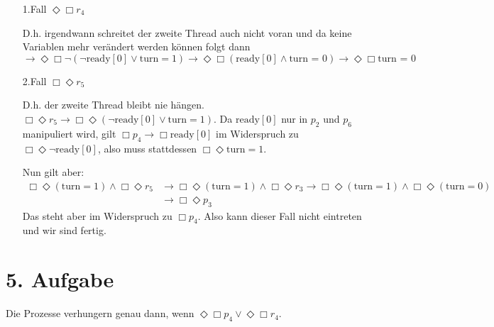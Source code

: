 \documentclass[numbers=noendperiod]{scrartcl}
\begin{document}
\begin{enumerate}[1.]
	\begin{enumerate}[1.]
		\item[1.Fall] $\Diamond \Box r_4$
		
		D.h. irgendwann schreitet der zweite Thread auch nicht voran und da keine Variablen mehr verändert werden können folgt dann $\rightarrow \Diamond \Box \lnot (\lnot \text{ready} [0] \lor \text{turn} = 1) \rightarrow \Diamond \Box (\text{ready}[0] \land \text{turn = 0}) \rightarrow \Diamond \Box \text{turn = 0}$
		
		\item[2.Fall] $\Box \Diamond r_5$
		
		D.h. der zweite Thread bleibt nie hängen. $\Box \Diamond r_5 \rightarrow \Box \Diamond (\lnot \text{ready}[0] \lor \text{turn} = 1)$. Da $\text{ready}[0]$ nur in $p_2$ und $p_6$ manipuliert wird, gilt $\Box p_4 \rightarrow \Box \text{ready}[0]$ im Widerspruch zu $\Box \Diamond \lnot \text{ready}[0]$, also muss stattdessen $\Box \Diamond \text{turn} = 1$.
		
		Nun gilt aber:
		\begin{align}
			 \Box \Diamond (\text{turn} = 1) \land \Box \Diamond r_5 &\rightarrow \Box \Diamond (\text{turn} = 1) \land \Box \Diamond r_3 \rightarrow \Box \Diamond (\text{turn} = 1) \land \Box \Diamond (\text{turn} = 0)\\
			 &\rightarrow \Box \Diamond p_3
		\end{align}
		Das steht aber im Widerspruch zu $\Box p_4$. Also kann dieser Fall nicht eintreten und wir sind fertig.
	\end{enumerate}

\end{enumerate}

\section*{5. Aufgabe}

Die Prozesse verhungern genau dann, wenn $\Diamond \Box p_4 \lor \Diamond \Box r_4$.\\
\end{document}
